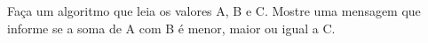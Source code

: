 
\question[10]

Faça um algoritmo que leia os valores A, B e C. Mostre uma mensagem que informe se a soma de A com B é menor, maior ou igual a C.

